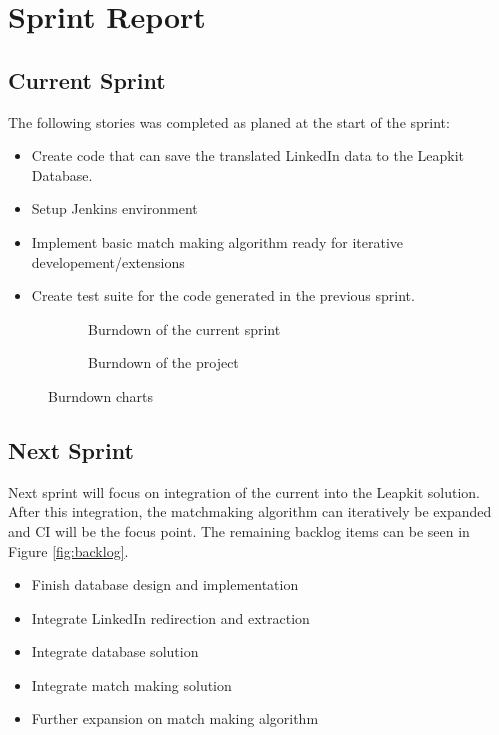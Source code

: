 \section{Sprint Report}

\subsection{Current Sprint}

The following stories was completed as planed at the start of the sprint:
\begin{itemize}
    \item Create code that can save the translated LinkedIn data to the Leapkit Database.
    \item Setup Jenkins environment
    \item Implement basic match making algorithm ready for iterative developement/extensions
    \item Create test suite for the code generated in the previous sprint.
\end{itemize}

\begin{figure}[!ht]
    \centering
    \begin{subfigure}[b]{0.5\textwidth}
        \scalebox{.6}{}
        \caption{Burndown of the current sprint}
        \label{fig:burndownSprint}
    \end{subfigure}%
    \begin{subfigure}[b]{0.5\textwidth}
        \scalebox{.7}{}
        \caption{Burndown of the project}
        \label{fig:burndownProject}
    \end{subfigure}
    \caption{Burndown charts}
\end{figure}

\subsection{Next Sprint}
Next sprint will focus on integration of the current into the Leapkit solution. After this integration, the matchmaking algorithm can iteratively be expanded and CI will be the focus point. The remaining backlog items can be seen in Figure \ref{fig:backlog}.
\begin{itemize}
\item Finish database design and implementation
\item Integrate LinkedIn redirection and extraction
\item Integrate database solution
\item Integrate match making solution
\item Further expansion on match making algorithm
\end{itemize}

